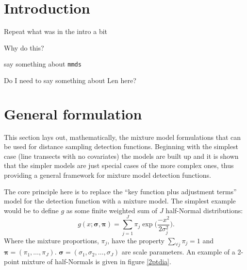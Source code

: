 \section{Introduction}

Repeat what was in the intro a bit

Why do this?

say something about \texttt{mmds}


Do I need to say something about Len here?


\section{General formulation}

This section lays out, mathematically, the mixture model formulations that can be used for distance sampling detection functions. Beginning with the simplest case (line transects with no covariates) the models are built up and it is shown that the simpler models are just special cases of the more complex ones, thus providing a general framework for mixture model detection functions.

The core principle here is to replace the ``key function plus adjustment terms'' model for the detection function with a mixture model. The simplest example would be to define $g$ as some finite weighted sum of $J$ half-Normal distributions:
\begin{equation}
g(x;\bm{\sigma},\bm{\pi}) = \sum_{j=1}^J \pi_j \exp \Big( \frac{-x^2}{2 \sigma_j^2}\Big).
\label{mmds-simplemix}
\end{equation}
Where the mixture proportions, $\pi_j$, have the property $\sum_{\forall j}\pi_j=1$ and $\bm{\pi} = (\pi_1, \dots, \pi_J)$. $\bm{\sigma}=(\sigma_1,\sigma_2,\dots,\sigma_J)$ are scale parameters. An example of a 2-point mixture of half-Normals is given in figure \ref{2ptdia}.

